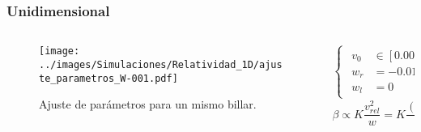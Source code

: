 \documentclass{beamer}
\begin{document}
\begin{frame}%
    \frametitle[prueb1]{Unidimensional}
    \begin{columns}
        \hspace{0.5cm}
    \begin{column}{0.5\textwidth}
        \begin{figure}
            \centering
            \texttt{[image: ../images/Simulaciones/Relatividad\_1D/ajuste\_parametros\_W-001.pdf]}
            \caption{Ajuste de parámetros para un mismo billar.}
        \end{figure}         
    \end{column}
    \begin{column}{0.5\textwidth}
        \vspace{1cm}
        \begin{equation*}
        \begin{cases}
             \begin{aligned}
                v_0 &\in [0.001; 0.9]c \\[0.5cm]
                w_r &= -0.01c \\ 
                w_l &= 0
            \end{aligned}
        \end{cases}
    \end{equation*}
             \vspace{1cm}
             \begin{equation*}
                \beta \propto K \dfrac{v^2_{rel}}{w} = K\dfrac{(v_0 - w)^2}{w}
            \end{equation*}
    \end{column}
    \end{columns}
\end{frame}
\end{document}
